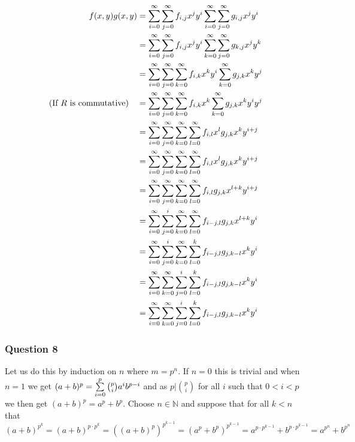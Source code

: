\documentclass{article}
\begin{document}
\begin{align*}
f(x,y)g(x,y) &= \sumfrom{i=0}{\infty}{\sumfrom{j=0}{\infty}{f_{i,j}x^j}y^i} \sumfrom{i=0}{\infty}{\sumfrom{j=0}{\infty}{g_{i,j}x^j}y^i} \\
&=\sumfrom{i=0}{\infty}{\sumfrom{j=0}{\infty}{f_{i,j}x^j}y^i\sumfrom{k=0}{\infty}{\sumfrom{j=0}{\infty}{g_{k,j}x^j}y^k}}\\
&=\sumfrom{i=0}{\infty}{\sumfrom{j=0}{\infty}{\sumfrom{k=0}{\infty}{f_{i,k}x^k}y^i\sumfrom{k=0}{\infty}{g_{j,k}x^k}y^j}} \\
\text{(If $R$ is commutative)}\quad&=\sumfrom{i=0}{\infty}{\sumfrom{j=0}{\infty}{\sumfrom{k=0}{\infty}{f_{i,k}x^k}\sumfrom{k=0}{\infty}{g_{j,k}x^k}y^iy^j}} \\
&= \sumfrom{i=0}{\infty}{\sumfrom{j=0}{\infty}{\sumfrom{k=0}{\infty}{\sumfrom{l=0}{\infty}{f_{i,l}x^l}g_{j,k}x^k}y^{i+j}}}\\
&= \sumfrom{i=0}{\infty}{\sumfrom{j=0}{\infty}{\sumfrom{k=0}{\infty}{\sumfrom{l=0}{\infty}{f_{i,l}x^lg_{j,k}x^k}}y^{i+j}}}\\
&= \sumfrom{i=0}{\infty}{\sumfrom{j=0}{\infty}{\sumfrom{k=0}{\infty}{\sumfrom{l=0}{\infty}{f_{i,l}g_{j,k}x^{l+k}}}y^{i+j}}} \\
&= \sumfrom{i=0}{\infty}{\sumfrom{j=0}{i}{\sumfrom{k=0}{\infty}{\sumfrom{l=0}{\infty}{f_{i-j,l}g_{j,k}x^{l+k}}}}y^{i}}\\
&= \sumfrom{i=0}{\infty}{\sumfrom{j=0}{i}{\sumfrom{k=0}{\infty}{\sumfrom{l=0}{k}{f_{i-j,l}g_{j,k-l}}x^{k}}}y^{i}}\\
&=\sumfrom{i=0}{\infty}{\sumfrom{k=0}{\infty}{\sumfrom{j=0}{i}{\sumfrom{l=0}{k}{f_{i-j,l}g_{j,k-l}}x^{k}}}y^{i}}\\
&= \sumfrom{i=0}{\infty}{\sumfrom{k=0}{\infty}{\sumfrom{j=0}{i}{\sumfrom{l=0}{k}{f_{i-j,l}g_{j,k-l}}}x^{k}}y^{i}}
\end{align*}

\subsubsection{Question 8}
\def\LB{}\def\RB{}

Let us do this by induction on $n$ where $m = p^n$. If $n=0$ this is trivial and when $n = 1$ we get $(a+b)^p = \sumfrom{i=0}{p}{\binom pia^ib^{p-i}}$ and as $p|\binom pi$ for all $i$ such that $0 < i < p$ we then get $(a+b)^p = a^p+b^p$. Choose $n\in\mathbb N$ and suppose that for all $k < n$ that $$(a+b)^{p^k} = (a+b)^{p\cdot p^k} = \left((a+b)^p\right)^{p^{k-1}} = (a^p+b^p)^{p^{k-1}} = a^{p\cdot p^{k-1}}+b^{p\cdot p^{k-1}} = a^{p^n}+b^{p^n}$$
\end{document}
